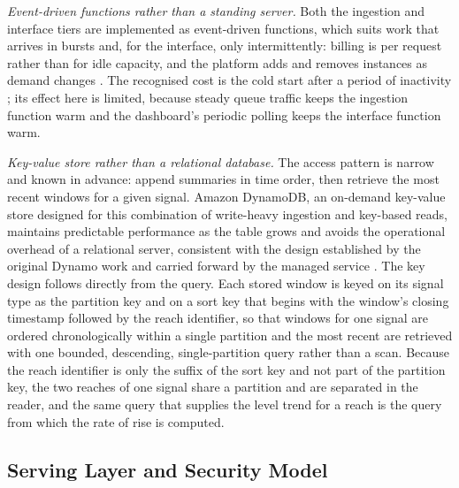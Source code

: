 \documentclass[conference]{IEEEtran}
\begin{document}
\textit{Event-driven functions rather than a standing server.} Both the ingestion and interface tiers are implemented as event-driven functions, which suits work that arrives in bursts and, for the interface, only intermittently: billing is per request rather than for idle capacity, and the platform adds and removes instances as demand changes \cite{armbrust2010}. The recognised cost is the cold start after a period of inactivity \cite{wang2018}; its effect here is limited, because steady queue traffic keeps the ingestion function warm and the dashboard's periodic polling keeps the interface function warm.

\textit{Key-value store rather than a relational database.} The access pattern is narrow and known in advance: append summaries in time order, then retrieve the most recent windows for a given signal. Amazon DynamoDB, an on-demand key-value store designed for this combination of write-heavy ingestion and key-based reads, maintains predictable performance as the table grows and avoids the operational overhead of a relational server, consistent with the design established by the original Dynamo work and carried forward by the managed service \cite{decandia2007, elhemali2022}. The key design follows directly from the query. Each stored window is keyed on its signal type as the partition key and on a sort key that begins with the window's closing timestamp followed by the reach identifier, so that windows for one signal are ordered chronologically within a single partition and the most recent are retrieved with one bounded, descending, single-partition query rather than a scan. Because the reach identifier is only the suffix of the sort key and not part of the partition key, the two reaches of one signal share a partition and are separated in the reader, and the same query that supplies the level trend for a reach is the query from which the rate of rise is computed.

\subsection{Serving Layer and Security Model}
\end{document}
